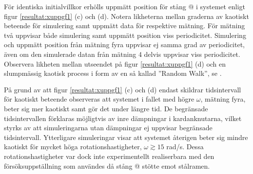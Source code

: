 \documentclass[12pt,a4paper]{article}
\makeatletter
\newcommand*{\rom}[1]{\expandafter\@slowromancap\romannumeral #1@}
\makeatother
\begin{document}




För identiska initialvillkor erhölls uppmätt position för stång \rom{2} i systemet enligt figur \ref{resultat:xuppgf1} (c) och (d). Notera likheterna mellan graderna av kaotiskt beteende för simulering samt uppmätt data för respektive mätning. För mätning två uppvisar både simulering samt uppmätt position viss periodicitet. Simulering och uppmätt position från mätning fyra uppvisar ej samma grad av periodicitet, även om den simulerade datan från mätning 4 delvis uppvisar viss periodicitet. Observera likheten mellan utseendet på figur \ref{resultat:xuppgf1} (d) och en slumpmässig kaotisk process i form av en så kallad ''Random Walk'', se \cite{matstat}.


På grund av att figur \ref{resultat:xuppgf1} (c) och (d) endast skildrar tidsintervall för kaotiskt beteende observeras att systemet i fallet med högre $\omega$, mätning fyra, beter sig mer kaotiskt samt gör det under längre tid. De begränsade tidsintervallen förklaras möjligtvis av inre dämpningar i kardanknutarna, vilket styrks av att simuleringarna utan dämpningar ej uppvisar begränsade tidsintervall. Ytterligare simuleringar visar att systemet återigen beter sig mindre kaotiskt för mycket höga rotationshastigheter, $\omega \gtrsim 15 $ rad/s. Dessa rotationshastigheter var dock inte experimentellt realiserbara med den försöksuppställning som användes då stång \rom{2} stötte emot stålramen.


\end{document}
